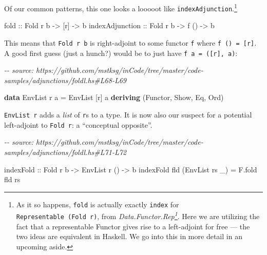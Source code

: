 \documentclass[]{article}
\newenvironment{Shaded}{}{}
\newcommand{\CommentTok}[1]{\textcolor[rgb]{0.38,0.63,0.69}{\textit{#1}}}
\newcommand{\DataTypeTok}[1]{\textcolor[rgb]{0.56,0.13,0.00}{#1}}
\newcommand{\KeywordTok}[1]{\textcolor[rgb]{0.00,0.44,0.13}{\textbf{#1}}}
\newcommand{\NormalTok}[1]{#1}
\newcommand{\OtherTok}[1]{\textcolor[rgb]{0.00,0.44,0.13}{#1}}
\renewcommand{\href}[2]{#2\footnote{\url{#1}}}
\begin{document}
Of our common patterns, this one looks a looooot like
\texttt{indexAdjunction}.\footnote{As it so happens, \texttt{fold} is actually
  exactly \texttt{index} for \texttt{Representable\ (Fold\ r)}, from
  \emph{\href{https://hackage.haskell.org/package/adjunctions/docs/Data-Functor-Rep.html}{Data.Functor.Rep}}.
  Here we are utilizing the fact that a representable Functor gives rise to a
  left-adjoint for free --- the two ideas are equivalent in Haskell. We go into
  this in more detail in an upcoming aside.}

\begin{Shaded}
\begin{Highlighting}[]
\OtherTok{fold            ::} \DataTypeTok{Fold}\NormalTok{ r b }\OtherTok{{-}>}\NormalTok{ [r]  }\OtherTok{{-}>}\NormalTok{ b}
\OtherTok{indexAdjunction ::} \DataTypeTok{Fold}\NormalTok{ r b }\OtherTok{{-}>}\NormalTok{ f () }\OtherTok{{-}>}\NormalTok{ b}
\end{Highlighting}
\end{Shaded}

This means that \texttt{Fold\ r\ b} is right-adjoint to some functor \texttt{f}
where \texttt{f\ ()\ =\ {[}r{]}}. A good first guess (just a hunch?) would be to
just have \texttt{f\ a\ =\ ({[}r{]},\ a)}:

\begin{Shaded}
\begin{Highlighting}[]
\CommentTok{{-}{-} source: https://github.com/mstksg/inCode/tree/master/code{-}samples/adjunctions/foldl.hs\#L68{-}L69}

\KeywordTok{data} \DataTypeTok{EnvList}\NormalTok{ r a }\OtherTok{=} \DataTypeTok{EnvList}\NormalTok{ [r] a}
  \KeywordTok{deriving}\NormalTok{ (}\DataTypeTok{Functor}\NormalTok{, }\DataTypeTok{Show}\NormalTok{, }\DataTypeTok{Eq}\NormalTok{, }\DataTypeTok{Ord}\NormalTok{)}
\end{Highlighting}
\end{Shaded}

\texttt{EnvList\ r} adds a \emph{list} of \texttt{r}s to a type. It is now also
our suspect for a potential left-adjoint to \texttt{Fold\ r}: a ``conceptual
opposite''.

\begin{Shaded}
\begin{Highlighting}[]
\CommentTok{{-}{-} source: https://github.com/mstksg/inCode/tree/master/code{-}samples/adjunctions/foldl.hs\#L71{-}L72}

\OtherTok{indexFold ::} \DataTypeTok{Fold}\NormalTok{ r b }\OtherTok{{-}>} \DataTypeTok{EnvList}\NormalTok{ r () }\OtherTok{{-}>}\NormalTok{ b}
\NormalTok{indexFold fld (}\DataTypeTok{EnvList}\NormalTok{ rs \_) }\OtherTok{=}\NormalTok{ F.fold fld rs}
\end{Highlighting}
\end{Shaded}
\end{document}
